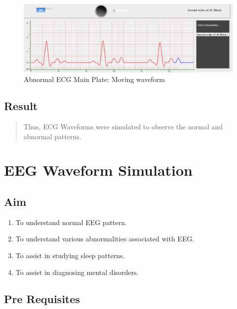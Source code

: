 \documentclass[
  11pt,
  letterpaper,
  DIV=11,
  numbers=noendperiod]{scrreprt}
\providecommand{\tightlist}{%
  \setlength{\itemsep}{0pt}\setlength{\parskip}{0pt}}\usepackage{longtable,booktabs,array}
\begin{document}
\begin{figure}[H]

{\centering \includegraphics{images/clipboard-3576673599.png}

}

\caption{Abnormal ECG Main Plate: Moving waveform}

\end{figure}%

\section{Result}\label{result-4}

\begin{quote}
Thus, ECG Waveforms were simulated to observe the normal and abnormal
patterns.
\end{quote}


\chapter{EEG Waveform Simulation}\label{eeg-waveform-simulation}

\section{Aim}\label{aim-6}

\begin{enumerate}
\def\labelenumi{\arabic{enumi}.}
\tightlist
\item
  To understand normal EEG pattern.
\item
  To understand various abnormalities associated with EEG.
\item
  To assist in studying sleep patterns.
\item
  To assist in diagnosing mental disorders.
\end{enumerate}

\section{Pre Requisites}\label{pre-requisites-1}
\end{document}
